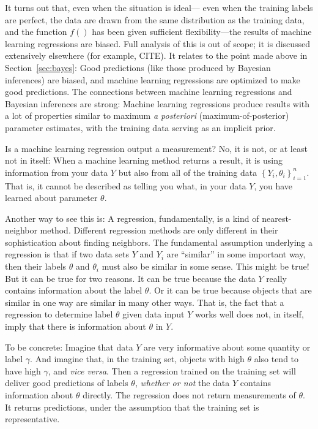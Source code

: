 \documentclass{article}
\newcommand{\sectionname}{Section}
\newcommand{\secref}[1]{\sectionname~\ref{#1}}
\newcommand{\foreign}[1]{\textsl{#1}}
\newcommand{\setof}[1]{\left\{{#1}\right\}}
\begin{document}
It turns out that, even when the situation is ideal---%
even when the training labels are perfect, the data are drawn from the same distribution as the training data, and the function $f()$ has been given sufficient flexibility---the results of machine learning regressions are biased.
Full analysis of this is out of scope; it is discussed extensively elsewhere (for example, CITE).
It relates to the point made above in \secref{sec:bayes}:
Good predictions (like those produced by Bayesian inferences) are biased, and machine learning regressions are optimized to make good predictions.
The connections between machine learning regressions and Bayesian inferences are strong:
Machine learning regressions produce results with a lot of properties similar to maximum \foreign{a posteriori} (maximum-of-posterior) parameter estimates, with the training data serving as an implicit prior.

Is a machine learning regression output a measurement?
No, it is not, or at least not in itself:
When a machine learning method returns a result, it is using information from your data $Y$
but also from all of the training data $\setof{Y_i, \theta_i}_{i=1}^n$.
That is, it cannot be described as telling you what, in your data $Y$, you have learned about parameter $\theta$.

Another way to see this is:
A regression, fundamentally, is a kind of nearest-neighbor method.
Different regression methods are only different in their sophistication about finding neighbors.
The fundamental assumption underlying a regression is that if two data sets $Y$ and $Y_i$ are ``similar'' in some important way, then their labels $\theta$ and $\theta_i$ must also be similar in some sense.
This might be true!
But it can be true for two reasons.
It can be true because the data $Y$ really contains information about the label $\theta$.
Or it can be true because objects that are similar in one way are similar in many other ways.
That is, the fact that a regression to determine label $\theta$ given data input $Y$ works well does not, in itself, imply that there is information about $\theta$ in $Y$.

To be concrete: Imagine that data $Y$ are very informative about some quantity or label $\gamma$.
And imagine that, in the training set, objects with high $\theta$ also tend to have high $\gamma$, and \foreign{vice versa}.
Then a regression trained on the training set will deliver good predictions of labels $\theta$, \emph{whether or not} the data $Y$ contains information about $\theta$ directly.
The regression does not return measurements of $\theta$.
It returns predictions, under the assumption that the training set is representative.
\end{document}
